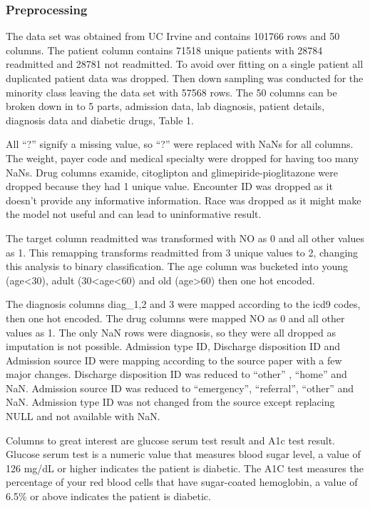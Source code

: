 \documentclass[5p]{elsarticle} %
\begin{document}
\hypertarget{preprocessing}{%
\subsubsection{Preprocessing}\label{preprocessing}}

The data set was obtained from UC Irvine and contains 101766 rows and 50
columns. The patient column contains 71518 unique patients with 28784
readmitted and 28781 not readmitted. To avoid over fitting on a single
patient all duplicated patient data was dropped. Then down sampling was
conducted for the minority class leaving the data set with 57568 rows.
The 50 columns can be broken down in to 5 parts, admission data, lab
diagnosis, patient details, diagnosis data and diabetic drugs, Table 1.

All ``?'' signify a missing value, so ``?'' were replaced with NaNs for
all columns. The weight, payer code and medical specialty were dropped
for having too many NaNs. Drug columns examide, citoglipton and
glimepiride-pioglitazone were dropped because they had 1 unique value.
Encounter ID was dropped as it doesn't provide any informative
information. Race was dropped as it might make the model not useful and
can lead to uninformative result.

The target column readmitted was transformed with NO as 0 and all other
values as 1. This remapping transforms readmitted from 3 unique values
to 2, changing this analysis to binary classification. The age column
was bucketed into young (age\textless30), adult
(30\textless age\textless60) and old (age\textgreater60) then one hot
encoded.

The diagnosis columns diag\_1,2 and 3 were mapped according to the icd9
codes, then one hot encoded. The drug columns were mapped NO as 0 and
all other values as 1. The only NaN rows were diagnosis, so they were
all dropped as imputation is not possible. Admission type ID, Discharge
disposition ID and Admission source ID were mapping according to the
source paper with a few major changes. Discharge disposition ID was
reduced to ``other'' , ``home'' and NaN. Admission source ID was reduced
to ``emergency'', ``referral'', ``other'' and NaN. Admission type ID was
not changed from the source except replacing NULL and not available with
NaN.

Columns to great interest are glucose serum test result and A1c test
result. Glucose serum test is a numeric value that measures blood sugar
level, a value of 126 mg/dL or higher indicates the patient is diabetic.
The A1C test measures the percentage of your red blood cells that have
sugar-coated hemoglobin, a value of 6.5\% or above indicates the patient
is diabetic.
\end{document}
